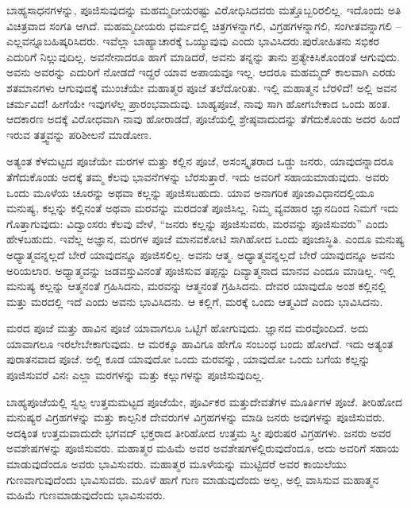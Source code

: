 \vskip 2pt

ಬಾಹ್ಯಸಾಧನಗಳನ್ನು, ಪೂಜಿಸುವುದನ್ನು ಮಹಮ್ಮದೀಯರಷ್ಟು ವಿರೋಧಿಸಿದವರು ಮತ್ತೊಬ್ಬರಿರಲಿಲ್ಲ. ಇದೊಂದು ಅತಿ ವಿಚಿತ್ರವಾದ ಸಂಗತಿ ಆಗಿದೆ. ಮಹಮ್ಮದೀಯರು ಧರ್ಮದಲ್ಲಿ ಚಿತ್ರಗಳನ್ನಾಗಲಿ, ವಿಗ್ರಹಗಳನ್ನಾಗಲಿ, ಸಂಗೀತವನ್ನಾಗಲಿ – ಎಲ್ಲವನ್ನೂ\break ಬಹಿಷ್ಕರಿಸಿದರು. ಇವೆಲ್ಲಾ ಬಾಹ್ಯಾಚಾರಕ್ಕೆ ಒಯ್ಯುವುವು ಎಂದು ಭಾವಿಸಿದರು.\break ಪುರೋಹಿತನು ಸಭಿಕರ ಎದುರಿಗೆ ನಿಲ್ಲುವುದಿಲ್ಲ. ಅವನೇನಾದರೂ ಹಾಗೆ ಮಾಡಿದರೆ, ಅವನು ತನ್ನನ್ನು ತಾನು ಪ್ರತ್ಯೇಕಿಸಿಕೊಂಡಂತೆ ಆಗುವುದು. ಅವನು ಅವರನ್ನು ಎದುರಿಗೆ ನೋಡದೆ ಇದ್ದರೆ ಯಾವ ಅಪಾಯವೂ ಇಲ್ಲ. ಆದರೂ ಮಹಮ್ಮದ್ ಕಾಲವಾಗಿ ಎರಡು ಶತಮಾನಗಳು ಆಗುವುದಕ್ಕೆ ಮುಂಚೆಯೇ ಮಹಾತ್ಮರ ಪೂಜೆ ತಲೆದೋರಿತು. ಇಲ್ಲಿ ಮಹಾತ್ಮನ ಬೆರಳಿದೆ! ಅಲ್ಲಿ ಅವನ ಚರ್ಮವಿದೆ! ಹೀಗೆಯೇ ಇವುಗಳೆಲ್ಲ ಪ್ರಾರಂಭವಾದುವು. ಬಾಹ್ಯಪೂಜೆ, ನಾವು ಸಾಗಿ ಹೋಗಬೇಕಾದ ಒಂದು ಹಂತ. ಆದಕಾರಣ ಅದಕ್ಕೆ ವಿರೋಧವಾಗಿ ನಾವು ಹೋರಾಡದೆ, ಪೂಜೆಯಲ್ಲಿ ಶ್ರೇಷ್ಠವಾದುದನ್ನು ತೆಗೆದುಕೊಂಡು ಅದರ ಹಿಂದೆ ಇರುವ ತತ್ತ್ವವನ್ನು ಪರಿಶೀಲನೆ ಮಾಡೋಣ.

\vskip 2pt

ಅತ್ಯಂತ ಕೆಳಮಟ್ಟದ ಪೂಜೆಯೇ ಮರಗಳ ಮತ್ತು ಕಲ್ಲಿನ ಪೂಜೆ, ಅಸಂಸ್ಕೃತರಾದ ಒಡ್ಡು ಜನರು, ಯಾವುದನ್ನಾದರೂ ತೆಗೆದುಕೊಂಡು ಅದಕ್ಕೆ ತಮ್ಮ ಕೆಲವು ಭಾವನೆಗಳನ್ನು ಬೆರಸುತ್ತಾರೆ. ಇದು ಅವರಿಗೆ ಸಹಾಯಮಾಡುವುದು. ಅವರು ಒಂದು ಮೂಳೆಯ ಚೂರನ್ನು ಅಥವಾ ಕಲ್ಲನ್ನು ಪೂಜಿಸಬಹುದು. ಯಾವ ಅನಾಗರಿಕ ಪೂಜಾವಿಧಾನದಲ್ಲಿಯೂ ಮನುಷ್ಯ, ಕಲ್ಲನ್ನು ಕಲ್ಲಿನಂತೆ ಅಥವಾ ಮರವನ್ನು ಮರದಂತೆ ಪೂಜಿಸಿಲ್ಲ. ನಿಮ್ಮ ವ್ಯವಹಾರ ಜ್ಞಾನದಿಂದ ನಿಮಗೆ ಇದು ಗೊತ್ತಾಗುವುದು: ವಿದ್ವಾಂಸರು ಕೆಲವು ವೇಳೆ, “ಜನರು ಕಲ್ಲನ್ನು ಪೂಜಿಸುವರು, ಮರವನ್ನು ಪೂಜಿಸುವರು” ಎಂದು ಹೇಳಬಹುದು. ಇವೆಲ್ಲ ಅಜ್ಞಾನ, ಮರಗಳ ಪೂಜೆ ಮಾನವಕೋಟಿ ಸಾಗಿಹೋದ ಒಂದು ಪೂಜಾಸ್ಥಿತಿ. ಎಂದೂ ಮನುಷ್ಯ ಅಧ್ಯಾತ್ಮವನ್ನಲ್ಲದೆ ಬೇರೆ ಯಾವುದನ್ನೂ ಪೂಜಿಸಲಿಲ್ಲ. ಅವನು ಆತ್ಮ. ಅಧ್ಯಾತ್ಮವನ್ನಲ್ಲದೆ ಬೇರೆ ಯಾವುದನ್ನೂ ಅವನು ಅರಿಯಲಾರ. ಅಧ್ಯಾತ್ಮವನ್ನು ಜಡವಸ್ತುವಿನಂತೆ ಪೂಜಿಸುವ ತಪ್ಪನ್ನು ದಿವ್ಯಾತ್ಮನಾದ ಮಾನವ ಎಂದೂ ಮಾಡಿಲ್ಲ. ಇಲ್ಲಿ ಮನುಷ್ಯ ಕಲ್ಲನ್ನು ಆತ್ಮನಂತೆ ಗ್ರಹಿಸಿದನು, ಮರವನ್ನು ಆತ್ಮನಂತೆ ಗ್ರಹಿಸಿದನು. ದೇವರ ಯಾವುದೊ ಅಂಶ ಕಲ್ಲಿನಲ್ಲಿ ಮತ್ತು ಮರದಲ್ಲಿ ಇದೆ ಎಂದು ಅವನು ಭಾವಿಸಿದನು. ಆ ಕಲ್ಲಿಗೆ, ಮರಕ್ಕೆ ಒಂದು ಆತ್ಮವಿದೆ ಎಂದು ಭಾವಿಸಿದನು.

\vskip 2pt

ಮರದ ಪೂಜೆ ಮತ್ತು ಹಾವಿನ ಪೂಜೆ ಯಾವಾಗಲೂ ಒಟ್ಟಿಗೆ ಹೋಗುವುದು. ಜ್ಞಾನದ ಮರವೊಂದಿದೆ. ಅದು ಯಾವಾಗಲೂ ಇರಲೇಬೇಕಾಗುವುದು. ಆ ಮರಕ್ಕೂ ಹಾವಿಗೂ ಹೇಗೊ ಸಂಬಂಧ ಬಂದು ಹೋಗಿದೆ. ಇದು ಅತ್ಯಂತ ಪುರಾತನವಾದ ಪೂಜೆ. ಅಲ್ಲಿ ಕೂಡ ಯಾವುದೋ ಒಂದು ಮರವನ್ನು, ಯಾವುದೋ ಒಂದು ಬಗೆಯ ಕಲ್ಲನ್ನು ಪೂಜಿಸುವರೆ ವಿನಃ ಎಲ್ಲಾ ಮರಗಳನ್ನು ಮತ್ತು ಕಲ್ಲುಗಳನ್ನು ಪೂಜಿಸುವುದಿಲ್ಲ.

\vskip 2pt

ಬಾಹ್ಯಪೂಜೆಯಲ್ಲಿ ಸ್ವಲ್ಪ ಉತ್ತಮಮಟ್ಟದ ಪೂಜೆಯೇ, ಪೂರ್ವಿಕರ ಮತ್ತು\break ದೇವತೆಗಳ ಮೂರ್ತಿಗಳ ಪೂಜೆ. ತೀರಿಹೋದ ಮನುಷ್ಯರ ವಿಗ್ರಹಗಳನ್ನು ಮತ್ತು ಕಾಲ್ಪನಿಕ ದೇವರುಗಳ ವಿಗ್ರಹಗಳನ್ನು ಮಾಡಿ ಜನರು ಅವುಗಳನ್ನು ಪೂಜಿಸುವರು. ಅದಕ್ಕಿಂತ ಉತ್ತಮವಾದುದೇ ಭಗವದ್ ಭಕ್ತರಾದ ತೀರಿಹೋದ ಉತ್ತಮ ಸ್ತ್ರೀ ಪುರುಷರ ವಿಗ್ರಹಗಳು. ಜನರು ಅವರ ಅವಶೇಷಗಳನ್ನು ಪೂಜಿಸುವರು. ಮಹಾತ್ಮರ ಮಹಿಮೆ ಅವರ ಅವಶೇಷಗಳಲ್ಲಿರುವುದೆಂದೂ, ಅದು ಅವರಿಗೆ ಸಹಾಯ ಮಾಡುವುದೆಂದೂ ಅವರು ಭಾವಿಸುವರು. ಮಹಾತ್ಮರ ಮೂಳೆಯನ್ನು ಮುಟ್ಟಿದರೆ ಅವರ ಕಾಯಿಲೆಯು ಗುಣವಾಗುವುದೆಂದು ಭಾವಿಸುವರು. ಮೂಳೆ ಹಾಗೆ ಗುಣ ಮಾಡುವುದೆಂದು ಅಲ್ಲ, ಅಲ್ಲಿ ವಾಸಿಸುವ ಮಹಾತ್ಮನ ಮಹಿಮೆ ಗುಣಮಾಡುವುದೆಂದು ಭಾವಿಸುವರು.

